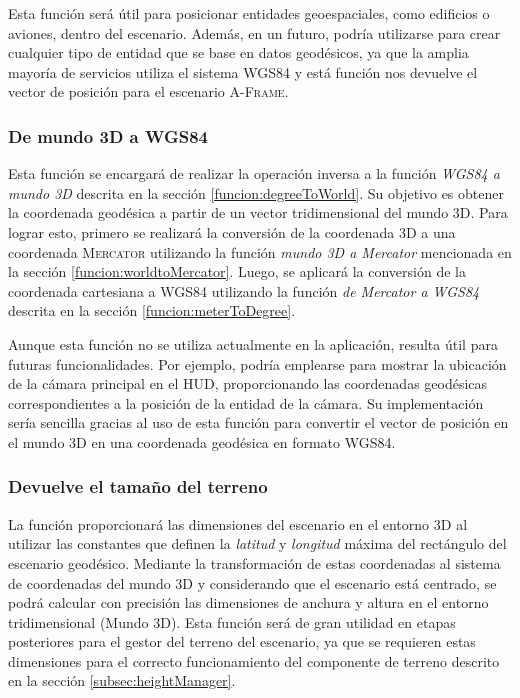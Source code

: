 \documentclass[a4paper, 11pt]{book}
\begin{document}
Esta función será útil para posicionar entidades geoespaciales, como edificios o aviones, dentro del escenario. Además, en un futuro, podría utilizarse para crear cualquier tipo de entidad que se base en datos geodésicos, ya que la amplia mayoría de servicios utiliza el sistema \textsc{WGS84} y está función nos devuelve el vector de posición para el escenario \textsc{A-Frame}.

\subsubsection{De mundo 3D a WGS84}
\label{funcion:worldToDegree}
Esta función se encargará de realizar la operación inversa a la función \emph{WGS84 a mundo 3D} descrita en la sección \ref{funcion:degreeToWorld}. Su objetivo es obtener la coordenada geodésica a partir de un vector tridimensional del mundo 3D. Para lograr esto, primero se realizará la conversión de la coordenada \textsc{3D} a una coordenada \textsc{Mercator} utilizando la función \emph{mundo 3D a Mercator} mencionada en la sección \ref{funcion:worldtoMercator}. Luego, se aplicará la conversión de la coordenada cartesiana a \textsc{WGS84} utilizando la función \emph{de Mercator a WGS84} descrita en la sección \ref{funcion:meterToDegree}.

Aunque esta función no se utiliza actualmente en la aplicación, resulta útil para futuras funcionalidades. Por ejemplo, podría emplearse para mostrar la ubicación de la cámara principal en el \textsc{\gls{HUD}}, proporcionando las coordenadas geodésicas correspondientes a la posición de la entidad de la cámara. Su implementación sería sencilla gracias al uso de esta función para convertir el vector de posición en el mundo 3D en una coordenada geodésica en formato \textsc{WGS84}.

\subsubsection{Devuelve el tamaño del terreno}
\label{funcion:getGroundSize}
La función proporcionará las dimensiones del escenario en el entorno \textsc{3D} al utilizar las constantes que definen la \emph{latitud} y \emph{longitud} máxima del rectángulo del escenario geodésico. Mediante la transformación de estas coordenadas al sistema de coordenadas del mundo \textsc{3D} y considerando que el escenario está centrado, se podrá calcular con precisión las dimensiones de anchura y altura en el entorno tridimensional (Mundo 3D). Esta función será de gran utilidad en etapas posteriores para el gestor del terreno del escenario, ya que se requieren estas dimensiones para el correcto funcionamiento del componente de terreno descrito en la sección \ref{subsec:heightManager}.
\end{document}

